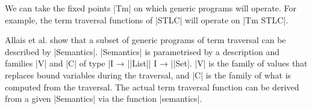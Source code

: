 \documentclass[sigplan,review,fleqn]{acmart}
\renewcommand{\verb}{\collectverb{\color{AgdaFunction}}}
\newcommand{\name}{\collectverb{\it}}
\begin{document}
We can take the fixed points \verb|Tm| on which generic programs will operate.
For example, the term traversal functions of \verb|STLC| will operate on \verb|Tm STLC|.
\begin{code}
	\>[0]\AgdaSpace{}%
	\AgdaSpace{}%
	\AgdaSymbol{(}\AgdaSpace{}%
	\AgdaSymbol{:}\AgdaSpace{}%
	\AgdaSpace{}%
	\AgdaSymbol{)}\AgdaSpace{}%
	\AgdaSymbol{:}\AgdaSpace{}%
	\AgdaSpace{}%
	\AgdaSpace{}%
	\AgdaSpace{}%
	\AgdaSpace{}%
	\AgdaSpace{}%
	\<%
\end{code}

Allais et al. show that a subset of generic programs of term traversal can be described by \verb|Semantics|.
\verb|Semantics| is parametrised by a description and families \name|V| and \name|C| of type \name|I → |\verb|List|\name| I → |\verb|Set|.
\name|V| is the family of values that replaces bound variables during the traversal, and \name|C| is the family of what is computed from the traversal.
The actual term traversal function can be derived from a given \verb|Semantics| via the function \verb|semantics|.
\end{document}
